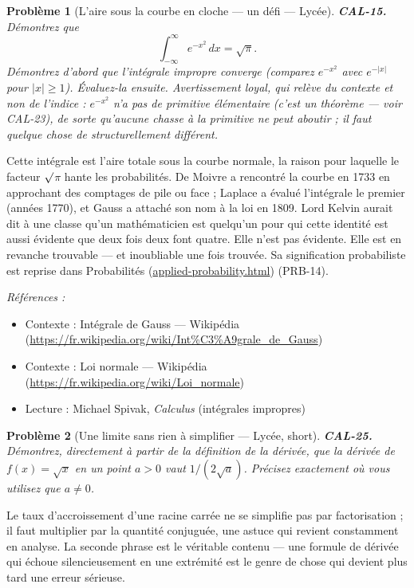 \documentclass[11pt]{article}
\newtheorem{problem}{Problème}
\newenvironment{refs}{\par\small\noindent\emph{Références :}\begin{itemize}\setlength\itemsep{0pt}}{\end{itemize}\normalsize}
\begin{document}
\begin{problem}[{L'aire sous la courbe en cloche --- un défi --- Lycée}]
\textbf{CAL-15.} Démontrez que
\[ \int_{-\infty}^{\infty} e^{-x^2}\,dx = \sqrt{\pi}. \]
Démontrez d'abord que l'intégrale impropre converge (comparez $ e^{-x^2} $ avec
$ e^{-|x|} $ pour $ |x|\ge 1 $). Évaluez-la ensuite. Avertissement loyal, qui relève du contexte et
non de l'indice : $ e^{-x^2} $ n'a pas de primitive élémentaire (c'est un théorème --- voir
CAL-23), de sorte qu'aucune chasse à la primitive ne peut aboutir ; il faut quelque chose de
structurellement différent.
\end{problem}

\noindent Cette intégrale est l'aire totale sous la courbe normale, la raison pour laquelle le
facteur $\surd$$\pi$ hante les probabilités. De Moivre a rencontré la courbe en 1733 en approchant des
comptages de pile ou face ; Laplace a évalué l'intégrale le premier (années 1770), et Gauss a attaché son nom à la
loi en 1809. Lord Kelvin aurait dit à une classe qu'un mathématicien est quelqu'un
pour qui cette identité est aussi évidente que deux fois deux font quatre. Elle n'est pas évidente. Elle est
en revanche trouvable --- et inoubliable une fois trouvée. Sa signification probabiliste est reprise dans
Probabilités (\url{applied-probability.html}) (PRB-14).

\begin{refs}
\item Contexte : Intégrale de Gauss --- Wikipédia (\url{https://fr.wikipedia.org/wiki/Int%C3%A9grale_de_Gauss})
\item Contexte : Loi normale --- Wikipédia (\url{https://fr.wikipedia.org/wiki/Loi_normale})
\item Lecture : Michael Spivak, \textit{Calculus} (intégrales impropres)
\end{refs}

\bigskip

\begin{problem}[{Une limite sans rien à simplifier --- Lycée, short}]
\textbf{CAL-25.} Démontrez, directement à partir de la définition de la dérivée, que la dérivée de $ f(x) = \sqrt{x} $ en un point $ a > 0 $ vaut $ 1/(2\sqrt{a}) $. Précisez exactement où vous utilisez que $ a \neq 0 $.
\end{problem}

\noindent Le taux d'accroissement d'une racine carrée ne se simplifie pas par factorisation ; il faut multiplier par la quantité conjuguée, une astuce qui revient constamment en analyse. La seconde phrase est le véritable contenu --- une formule de dérivée qui échoue silencieusement en une extrémité est le genre de chose qui devient plus tard une erreur sérieuse.
\end{document}
